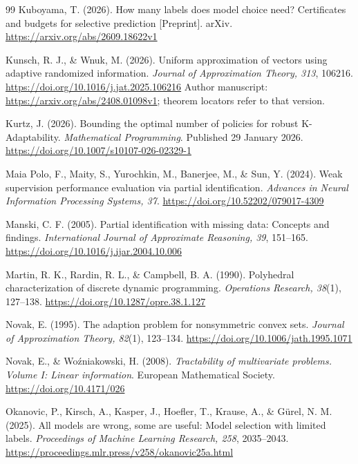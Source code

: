 \documentclass[12pt]{article}
\begin{document}
\begin{thebibliography}{99}
Kuboyama, T. (2026).
How many labels does model choice need? Certificates and budgets for selective
prediction [Preprint].
arXiv. \url{https://arxiv.org/abs/2609.18622v1}

Kunsch, R. J., \& Wnuk, M. (2026).
Uniform approximation of vectors using adaptive randomized information.
\emph{Journal of Approximation Theory, 313}, 106216.
\url{https://doi.org/10.1016/j.jat.2025.106216}
Author manuscript: \url{https://arxiv.org/abs/2408.01098v1};
theorem locators refer to that version.

Kurtz, J. (2026). Bounding the optimal number of policies for robust
K-Adaptability. \emph{Mathematical Programming}. Published 29 January 2026.
\url{https://doi.org/10.1007/s10107-026-02329-1}

Maia Polo, F., Maity, S., Yurochkin, M., Banerjee, M., \& Sun, Y. (2024).
Weak supervision performance evaluation via partial identification.
\emph{Advances in Neural Information Processing Systems, 37}.
\url{https://doi.org/10.52202/079017-4309}

Manski, C. F. (2005). Partial identification with missing data:
Concepts and findings. \emph{International Journal of Approximate
Reasoning, 39}, 151--165.
\url{https://doi.org/10.1016/j.ijar.2004.10.006}

Martin, R. K., Rardin, R. L., \& Campbell, B. A. (1990).
Polyhedral characterization of discrete dynamic programming.
\emph{Operations Research, 38}(1), 127--138.
\url{https://doi.org/10.1287/opre.38.1.127}

Novak, E. (1995). The adaption problem for nonsymmetric convex sets.
\emph{Journal of Approximation Theory, 82}(1), 123--134.
\url{https://doi.org/10.1006/jath.1995.1071}

Novak, E., \& Wo{\'z}niakowski, H. (2008).
\emph{Tractability of multivariate problems. Volume I: Linear information}.
European Mathematical Society.
\url{https://doi.org/10.4171/026}

Okanovic, P., Kirsch, A., Kasper, J., Hoefler, T., Krause, A., \&
G\"urel, N. M. (2025). All models are wrong, some are useful:
Model selection with limited labels.
\emph{Proceedings of Machine Learning Research, 258}, 2035--2043.
\url{https://proceedings.mlr.press/v258/okanovic25a.html}


\end{thebibliography}
\end{document}
